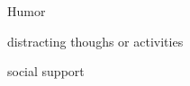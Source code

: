 \documentclass[aspectratio=169]{beamer}
\begin{document}
\begin{frame}
  \begin{center}
    \Huge Humor
    \\ \small \cite{hh15}
  \end{center}
\end{frame}

\begin{frame}
  \begin{center}
    \Huge distracting thoughs or activities
  \end{center}
\end{frame}

\begin{frame}
  \begin{center}
    \Huge social support
  \end{center}
\end{frame}

\begin{frame}
  \begin{center}
    \Huge
  \end{center}
\end{frame}

\begin{frame}
  \begin{center}
    \Huge
  \end{center}
\end{frame}

\begin{frame}
  \begin{center}
    \Huge
  \end{center}
\end{frame}

\begin{frame}
  \begin{center}
    \Huge
  \end{center}
\end{frame}

\begin{frame}
 

  
\end{frame}
\end{document}
